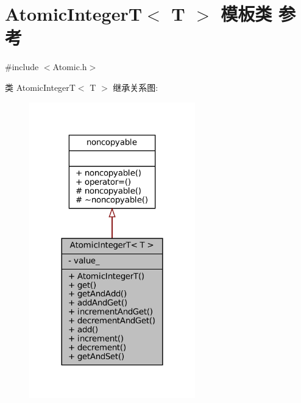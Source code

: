 \hypertarget{classmuduo_1_1detail_1_1AtomicIntegerT}{}\section{Atomic\+IntegerT$<$ T $>$ 模板类 参考}
\label{classmuduo_1_1detail_1_1AtomicIntegerT}


{\ttfamily \#include $<$Atomic.\+h$>$}



类 Atomic\+IntegerT$<$ T $>$ 继承关系图\+:
\nopagebreak
\begin{figure}[H]
\begin{center}
\leavevmode
\includegraphics[width=204pt]{classmuduo_1_1detail_1_1AtomicIntegerT__inherit__graph}
\end{center}
\end{figure}


